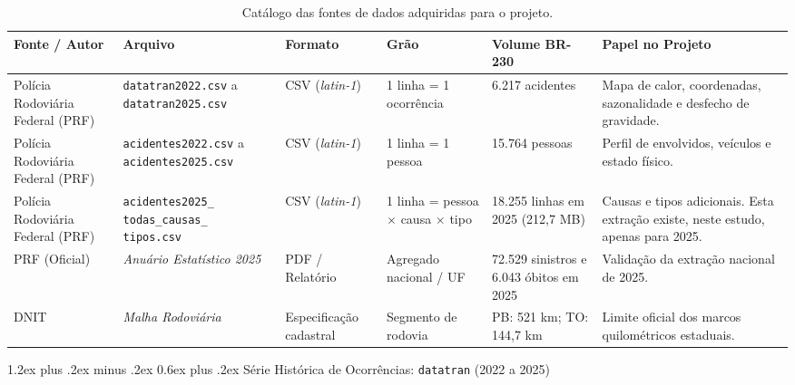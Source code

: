 \documentclass[11pt,a4paper]{article}
\makeatletter
\renewcommand\subsection{
\@startsection{subsection}{2}{0pt}%
{1.2ex plus .2ex minus .2ex}%
{0.6ex plus .2ex}%
{\normalfont\large\bfseries\color{secondary}}
}
\makeatother
\begin{document}
\begin{table}[H]
\centering
\small
\renewcommand{\arraystretch}{1.25}
\caption{Catálogo das fontes de dados adquiridas para o projeto.}
\label{tab:catalogo}
\begin{tabularx}{\textwidth}{|p{2.6cm}|p{2.5cm}|p{1.8cm}|p{2.3cm}|p{2.0cm}|X|}
\hline
\textbf{Fonte / Autor} & \textbf{Arquivo} & \textbf{Formato} & \textbf{Grão} & \textbf{Volume BR-230} & \textbf{Papel no Projeto} \\
\hline
Polícia Rodoviária Federal (PRF) & \texttt{datatran2022.csv} a \texttt{datatran2025.csv} & CSV (\textit{latin-1}) & 1 linha = 1 ocorrência & 6.217 acidentes & Mapa de calor, coordenadas, sazonalidade e desfecho de gravidade. \\
\hline
Polícia Rodoviária Federal (PRF) & \texttt{acidentes2022.csv} a \texttt{acidentes2025.csv} & CSV (\textit{latin-1}) & 1 linha = 1 pessoa & 15.764 pessoas & Perfil de envolvidos, veículos e estado físico. \\
\hline
Polícia Rodoviária Federal (PRF) & \texttt{acidentes2025\_ todas\_causas\_ tipos.csv} & CSV (\textit{latin-1}) & 1 linha = pessoa $\times$ causa $\times$ tipo & 18.255 linhas em 2025 (212,7 MB) & Causas e tipos adicionais. Esta extração existe, neste estudo, apenas para 2025. \\
\hline
PRF (Oficial) & \textit{Anuário Estatístico 2025} & PDF / Relatório & Agregado nacional / UF & 72.529 sinistros e 6.043 óbitos em 2025 & Validação da extração nacional de 2025. \\
\hline
DNIT & \textit{Malha Rodoviária} & Especificação cadastral & Segmento de rodovia & PB: 521 km; TO: 144,7 km & Limite oficial dos marcos quilométricos estaduais. \\
\hline
\end{tabularx}
\end{table}

\subsection{Série Histórica de Ocorrências: \texttt{datatran} (2022 a 2025)}
\end{document}

